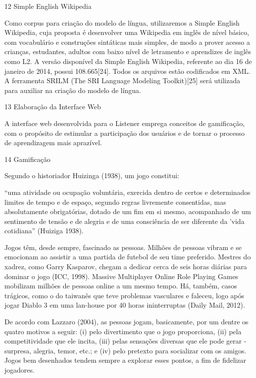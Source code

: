 12 Simple English Wikipedia

Como corpus para cria\c{c}\~ao do modelo de l\'ingua, utilizaremos a Simple
English Wikipedia, cuja proposta \'e desenvolver uma Wikipedia em ingl\^es
de n\'ivel b\'asico, com vocabul\'ario e constru\c{c}\~oes sint\'aticas mais simples,
de modo a prover acesso a crian\c{c}as, estudantes, adultos com baixo n\'ivel
de letramento e aprendizes de ingl\^es como L2. A vers\~ao dispon\'ivel da
Simple English Wikipedia, referente ao dia 16 de janeiro de 2014, possui
108.665{[}24{]}. Todos os arquivos est\~ao codificados em XML. A
ferramenta SRILM (The SRI Language Modeling Toolkit){[}25{]} ser\'a
utilizada para auxiliar na cria\c{c}\~ao do modelo de l\'ingua.

13 Elabora\c{c}\~ao da Interface Web

A interface web desenvolvida para o Listener emprega conceitos de
gamifica\c{c}\~ao, com o prop\'osito de estimular a participa\c{c}\~ao dos usu\'arios e
de tornar o processo de aprendizagem mais apraz\'ivel.

14 Gamifica\c{c}\~ao

Segundo o historiador Huizinga (1938), um jogo constitui:

``uma atividade ou ocupa\c{c}\~ao volunt\'aria, exercida dentro de certos e
determinados limites de tempo e de espa\c{c}o, segundo regras livremente
consentidas, mas absolutamente obrigat\'orias, dotado de um fim em si
mesmo, acompanhado de um sentimento de tens\~ao e de alegria e de uma
consci\^encia de ser diferente da 'vida cotidiana'' (Huiziga 1938).

Jogos t\^em, desde sempre, fascinado as pessoas. Milh\~oes de pessoas vibram
e se emocionam ao assistir a uma partida de futebol de seu time
preferido. Mestres do xadrez, como Garry Kasparov, chegam a dedicar
cerca de seis horas di\'arias para dominar o jogo (ICC, 1998). Massive
Multiplayer Online Role Playing Games mobilizam milh\~oes de pessoas
online a um mesmo tempo. H\'a, tamb\'em, casos tr\'agicos, como o do taiwan\^es
que teve problemas vasculares e faleceu, logo ap\'os jogar Diablo 3 em uma
lan-house por 40 horas ininterruptas (Daily Mail, 2012).

De acordo com Lazzaro (2004), as pessoas jogam, basicamente, por um
dentre os quatro motivos a seguir: (i) pelo divertimento que o jogo
proporciona, (ii) pela competitividade que ele incita, (iii) pelas
sensa\c{c}\~oes diversas que ele pode gerar - surpresa, alegria, temor, etc.;
e (iv) pelo pretexto para socializar com os amigos. Jogos bem desenhados
tendem sempre a explorar esses pontos, a fim de fidelizar jogadores.

